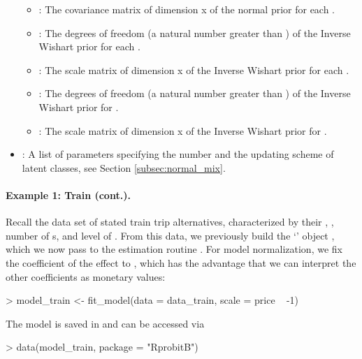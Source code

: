 \documentclass[article]{jss}
\newcommand{\class}[1]{`\code{#1}'}
\newcommand{\fct}[1]{\code{#1()}}
\begin{document}
\begin{itemize}
\begin{itemize}
    \item {}: The covariance matrix of dimension  x  of the normal prior for each .
    \item {}: The degrees of freedom (a natural number greater than ) of the Inverse Wishart prior for each .
    \item {}: The scale matrix of dimension  x  of the Inverse Wishart prior for each .
    \item {}: The degrees of freedom (a natural number greater than ) of the Inverse Wishart prior for .
    \item {}: The scale matrix of dimension  x  of the Inverse Wishart prior for .
  \end{itemize}
  \item {}: A list of parameters specifying the number and the updating scheme of latent classes, see Section \ref{subsec:normal_mix}.
\end{itemize}

\paragraph{Example 1: Train (cont.).}

Recall the  data set of stated train trip alternatives, characterized by their , , number of s, and level of . From this data, we previously build the \class{RprobitB\_data} object , which we now pass to the estimation routine \fct{fit\_model}. For model normalization, we fix the coefficient of the  effect to , which has the advantage that we can interpret the other coefficients as monetary values:

\begin{Schunk}
\begin{Sinput}
> model_train <- fit_model(data = data_train, scale = price ~ -1)
\end{Sinput}
\end{Schunk}

The model is saved in  and can be accessed via

\begin{Schunk}
\begin{Sinput}
> data(model_train, package = "RprobitB")
\end{Sinput}
\end{Schunk}
\end{document}
